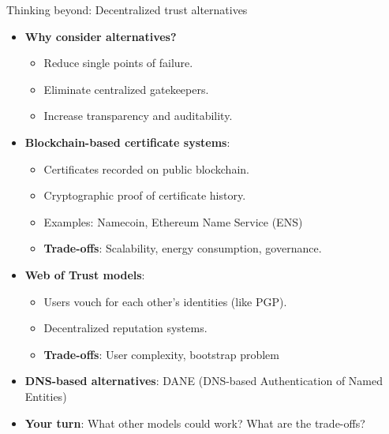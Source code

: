 \documentclass[aspectratio=169, lualatex, handout]{beamer}
\begin{document}
\begin{frame}{Thinking beyond: Decentralized trust alternatives}
	\begin{itemize}[<+->]
		\item \textbf{Why consider alternatives?}
		      \begin{itemize}
			      \item Reduce single points of failure.
			      \item Eliminate centralized gatekeepers.
			      \item Increase transparency and auditability.
		      \end{itemize}
		\item \textbf{Blockchain-based certificate systems}:
		      \begin{itemize}
			      \item Certificates recorded on public blockchain.
			      \item Cryptographic proof of certificate history.
			      \item Examples: Namecoin, Ethereum Name Service (ENS)
			      \item \textbf{Trade-offs}: Scalability, energy consumption, governance.
		      \end{itemize}
		\item \textbf{Web of Trust models}:
		      \begin{itemize}
			      \item Users vouch for each other's identities (like PGP).
			      \item Decentralized reputation systems.
			      \item \textbf{Trade-offs}: User complexity, bootstrap problem
		      \end{itemize}
		\item \textbf{DNS-based alternatives}: DANE (DNS-based Authentication of Named Entities)
		\item \textbf{Your turn}: What other models could work? What are the trade-offs?
	\end{itemize}
\end{frame}
\end{document}
